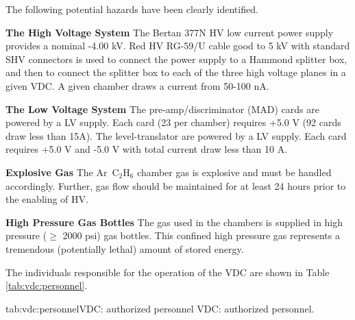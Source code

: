 \begin{safetyen}{5}{5}
The following potential hazards have been clearly identified.
\begin{description}
\item {\bf The High Voltage System}
The Bertan 377N HV low current power supply provides a nominal
-4.00 kV.  Red HV RG-59/U cable good to 5 kV with standard SHV
connectors is used to connect the power supply to a Hammond splitter
box, and then to connect the splitter box to each of the three high
voltage planes in a given VDC.  A given chamber draws a current
from  50-100 nA.
\item {\bf The Low Voltage System}
The pre-amp/discriminator (MAD) cards are powered by a LV supply. Each
card (23 per chamber) requires +5.0 V (92 cards draw less than
15A). The level-translator are powered by a LV supply. Each card
requires +5.0 V and -5.0 V with total current draw less than 10 A.
\item{\bf Explosive Gas} The Ar~C$_2$H$_6$ chamber gas is explosive
and must be handled accordingly.  Further, gas flow should be maintained
for at least 24 hours prior to the enabling of HV.
\item{\bf High Pressure Gas Bottles} The gas used in the chambers
is supplied in high pressure ($\ge$ 2000 psi) gas bottles. This
confined high pressure gas represents a tremendous (potentially lethal)
amount of stored energy.
\end{description}
\end{safetyen}

\begin{safetyen}{10}{15}
\end{safetyen}

The individuals responsible for the operation 
of the VDC are shown in Table \ref{tab:vdc:personnel}.

\begin{namestab}{tab:vdc:personnel}{VDC: authorized personnel}{%
      VDC: authorized personnel.}
  \BogdanWojtsekhowski{}
\end{namestab}


